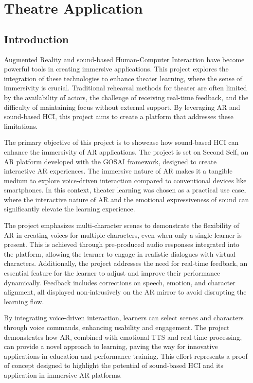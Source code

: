 \section{Theatre Application}

\subsection{Introduction}

Augmented Reality  and sound-based Human-Computer Interaction have become powerful tools in creating immersive applications. This project explores the integration of these technologies to enhance theater learning, where the sense of immersivity is crucial. Traditional rehearsal methods for theater are often limited by the availability of actors, the challenge of receiving real-time feedback, and the difficulty of maintaining focus without external support. By leveraging AR and sound-based HCI, this project aims to create a platform that addresses these limitations.

The primary objective of this project is to showcase how sound-based HCI can enhance the immersivity of AR applications. The project is set on Second Self, an AR platform developed with the GOSAI framework, designed to create interactive AR experiences. The immersive nature of AR makes it a tangible medium to explore voice-driven interaction compared to conventional devices like smartphones. In this context, theater learning was chosen as a practical use case, where the interactive nature of AR and the emotional expressiveness of sound can significantly elevate the learning experience.

The project emphasizes multi-character scenes to demonstrate the flexibility of AR in creating voices for multiple characters, even when only a single learner is present. This is achieved through pre-produced audio responses integrated into the platform, allowing the learner to engage in realistic dialogues with virtual characters. Additionally, the project addresses the need for real-time feedback, an essential feature for the learner to adjust and improve their performance dynamically. Feedback includes corrections on speech, emotion, and character alignment, all displayed non-intrusively on the AR mirror to avoid disrupting the learning flow.

By integrating voice-driven interaction, learners can select scenes and characters through voice commands, enhancing usability and engagement. The project demonstrates how AR, combined with emotional TTS and real-time processing, can provide a novel approach to learning, paving the way for innovative applications in education and performance training. This effort represents a proof of concept designed to highlight the potential of sound-based HCI and its application in immersive AR platforms.

